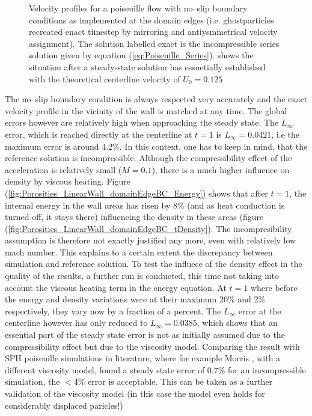 \documentclass{report}
\begin{document}
\begin{figure}[!htbp]
\caption[Velocity profiles Poiseuille flow]{Velocity profiles for a poiseuille flow with no--slip boundary conditions as implemented at the domain edges (i.e. ghostparticles recreated enact timestep by mirroring and antiysmmetrical velocity assignment). The solution labelled exact is the incompressible series solution given by equation (\ref{eq:Poiseuille_Series}).   shows the situation after a steady-state solution has essnetially established with the theoretical centerline velocity of $U_0=0.125$}

\end{figure}



The no--slip boundary condition is always respected very accurately and the exact velocity profile in the vicinity of the wall is matched at any time.
The global errors however are relatively high when approaching the steady state. The $L_\infty$ error, which is reached directly at the centerline at $t=1$ is $L_\infty=0.0421$, i.e the maximum error is around 4.2\%. In this context, one has to keep in mind, that the reference solution is incompressible. Although the compressibility effect of the acceleration is relatively small ($M=0.1$), there is a much higher influence on density by viscous heating. Figure (\ref{fig:Porosities_LinearWall_domainEdgeBC_Energy}) shows that after $t=1$, the internal energy in the wall areas has risen by $8\%$ (and as heat conduction is turned off, it stays there) influencing the density in these areas (figure (\ref{fig:Porosities_LinearWall_domainEdgeBC_tDensity}). The incompresibility assumption is therefore not exactly justified any more, even with relatively low mach number. This explains to a certain extent the discrepancy between simulation and reference solution. To test the influece of the density effect in the quality of the results, a further run is conducted, this time not taking into account the viscous heating term in the energy equation. At $t=1$ where before the energy and density variations were at their maximum 20\% and 2\% respectively, they vary now by a fraction of a percent. The $L_\infty$ error at the centerline however has only reduced to $L_\infty=0.0385$, which shows that an essential part of the steady state error is not as initially assumed due to the compressibility effect but due to the viscosity model.  
Comparing the result with SPH poiseuille simulations in literature, where for example Morris \cite{Morris1997}, with a different viscosity model, found a steady state error of $0.7\%$ for an incompressible simulation, the $<4\%$ error is acceptable. This can be taken as a further validation of the viscosity model (in this case the model even holds for considerably displaced paricles!)
\end{document}
